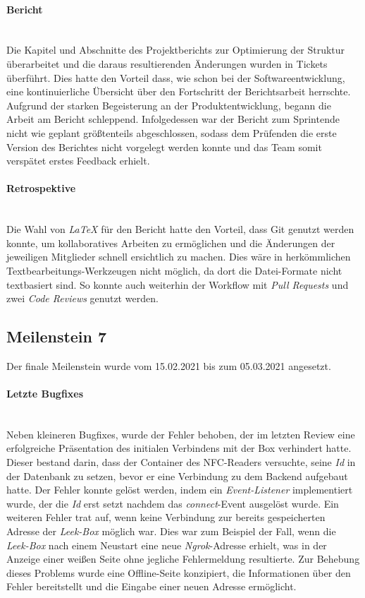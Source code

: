 \documentclass[10pt, a4paper]{article}
\begin{document}
\begin{onehalfspace}
\paragraph*{Bericht} $~$ \\
Die Kapitel und Abschnitte des Projektberichts zur Optimierung der Struktur überarbeitet und
die daraus resultierenden Änderungen wurden in Tickets überführt.
Dies hatte den Vorteil dass, wie schon bei der Softwareentwicklung, eine kontinuierliche Übersicht über den Fortschritt der Berichtsarbeit herrschte.
Aufgrund der starken Begeisterung an der Produktentwicklung, begann die Arbeit am Bericht schleppend.
Infolgedessen war der Bericht zum Sprintende nicht wie geplant größtenteils abgeschlossen, sodass dem Prüfenden die erste Version des Berichtes nicht vorgelegt werden konnte und das Team somit verspätet erstes Feedback erhielt.

\paragraph*{Retrospektive} $~$ \\
Die Wahl von \textit{LaTeX} für den Bericht hatte den Vorteil, dass Git genutzt werden konnte, um kollaboratives Arbeiten zu ermöglichen und die Änderungen der jeweiligen Mitglieder schnell ersichtlich zu machen.
Dies wäre in herkömmlichen Textbearbeitungs-Werkzeugen nicht möglich, da dort die Datei-Formate nicht textbasiert sind.
So konnte auch weiterhin der Workflow mit \textit{Pull Requests} und zwei \textit{Code Reviews} genutzt werden.

\subsection{Meilenstein 7}
Der finale Meilenstein wurde vom 15.02.2021 bis zum 05.03.2021 angesetzt.

\paragraph*{Letzte Bugfixes} $~$ \\
Neben kleineren Bugfixes, wurde der Fehler behoben, der im letzten Review eine erfolgreiche Präsentation des initialen Verbindens mit der Box verhindert hatte.
Dieser bestand darin, dass der Container des NFC-Readers versuchte, seine \textit{Id} in der Datenbank zu setzen, bevor er eine Verbindung zu dem Backend aufgebaut hatte.
Der Fehler konnte gelöst werden, indem ein \textit{Event-Listener} implementiert wurde, der die \textit{Id} erst setzt nachdem das \textit{connect}-Event ausgelöst wurde.
Ein weiteren Fehler trat auf, wenn keine Verbindung zur bereits gespeicherten Adresse der \textit{Leek-Box} möglich war.
Dies war zum Beispiel der Fall, wenn die \textit{Leek-Box} nach einem Neustart eine neue \textit{Ngrok}-Adresse erhielt, was in der Anzeige einer weißen Seite ohne jegliche Fehlermeldung resultierte.
Zur Behebung dieses Problems wurde eine Offline-Seite konzipiert, die Informationen über den Fehler bereitstellt und die Eingabe einer neuen Adresse ermöglicht.



\end{onehalfspace}
\end{document}
